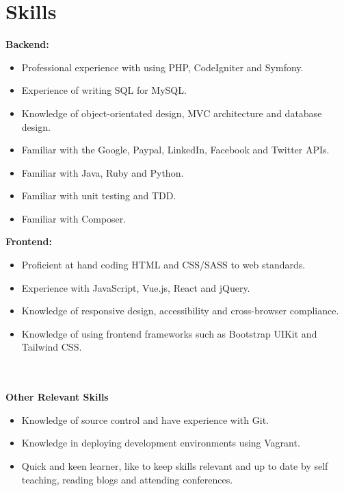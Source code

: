 \documentclass[11pt,a4paper,sans]{moderncv}
\begin{document}
\makecvtitle

\section{Skills}

\begin{minipage}[t]{0.45\textwidth}
	\textbf{Backend:}
	\begin{itemize}
		\item Professional experience with using PHP, CodeIgniter and Symfony. 
		\item Experience of writing SQL for MySQL.
		\item Knowledge of object-orientated design, MVC architecture and database design.
		\item Familiar with the Google, Paypal, LinkedIn, Facebook and Twitter APIs.
		\item Familiar with Java, Ruby and Python.
		\item Familiar with unit testing and TDD.
		\item Familiar with Composer.
	\end{itemize}
\end{minipage}
\begin{minipage}[t]{0.45\textwidth}
	\textbf{Frontend:}
	\begin{itemize}
		\item Proficient at hand coding HTML and CSS/SASS to web standards.
		\item Experience with JavaScript, Vue.js, React and jQuery.
		\item Knowledge of responsive design, accessibility and cross-browser compliance.
		\item Knowledge of using frontend frameworks such as Bootstrap UIKit and Tailwind CSS.
	\end{itemize}
\end{minipage}
\\\\
\textbf{Other Relevant Skills}
\begin{itemize}
	\item Knowledge of source control and have experience with Git.
	\item Knowledge in deploying development environments using Vagrant.
	\item Quick and keen learner, like to keep skills relevant and up to date by self teaching, reading blogs and attending conferences.  
\end{itemize}
\end{document}
